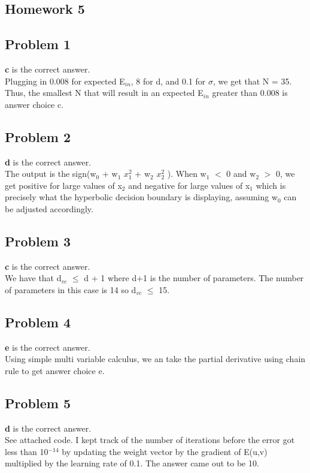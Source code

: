 \documentclass[12 pt]{article}
\begin{document}
	\begin{center}
		\section*{Homework 5}
	\end{center}
	
	
	\subsection*{Problem 1}	
	\textbf{c} is the correct answer. \\
	Plugging in 0.008 for expected E$_{in}$, 8 for d, and 0.1 for $\sigma$, we get that N = 35. Thus, the smallest N that will result in an expected E$_{in}$ greater than 0.008 is answer choice c.


	
	\subsection*{Problem 2}
	\textbf{d} is the correct answer. \\
	The output is the sign(w$_0$ + w$_1$ $x_1^2$ + w$_2$ $x_2^2$ ). When w$_1$ $<$ 0 and w$_2$ $>$ 0, we get positive for large values of x$_2$ and negative for large values of x$_1$ which is precisely what the hyperbolic decision boundary is displaying, assuming w$_0$ can be adjusted accordingly.

	
	\subsection*{Problem 3}
	\textbf{c} is the correct answer.\\
	We have that d$_{vc}$ $\leq$ d + 1 where d+1 is the number of parameters. The number of parameters in this case is 14 so d$_{vc}$ $\leq$ 15. 
	
	\subsection*{Problem 4}
	\textbf{e} is the correct answer.\\
	Using simple multi variable calculus, we an take the partial derivative using chain rule to get answer choice e.


	\subsection*{Problem 5}
	\textbf{d} is the correct answer.\\
	See attached code. I kept track of the number of iterations before the error got less than 10$^{-14}$ by updating the weight vector by the gradient of E(u,v) multiplied by the learning rate of 0.1. The answer came out to be 10.
\end{document}
